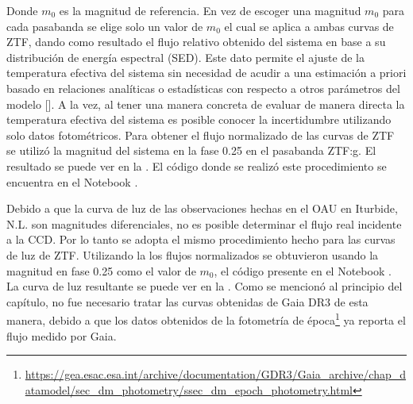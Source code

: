 Donde $m_0$ es la magnitud de referencia. En vez de escoger una magnitud $m_0$
para cada pasabanda se elige solo un valor de $m_0$ el cual se aplica a ambas
curvas de ZTF, dando como resultado el flujo relativo obtenido del sistema en
base a su distribución de energía espectral (SED). Este dato permite el ajuste
de la temperatura efectiva del sistema sin necesidad de acudir a una estimación
a priori basado en relaciones analíticas o estadísticas con respecto a otros
parámetros del modelo
[]. A la
vez, al tener una manera concreta de evaluar de manera directa la temperatura
efectiva del sistema es posible conocer la incertidumbre utilizando solo datos
fotométricos. Para obtener el flujo normalizado de las curvas de ZTF se utilizó
la magnitud del sistema en la fase 0.25 en el pasabanda ZTF:g. El resultado se
puede ver en la . El código donde se realizó
este procedimiento se encuentra en el Notebook
\href{https://github.com/KnightIV/UANL_MAPTA_Observaciones/blob/main/analisis/ztf/light-curve-processing.ipynb}{}.

Debido a que la curva de luz de las observaciones hechas en el OAU en Iturbide,
N.L. son magnitudes diferenciales, no es posible determinar el flujo real
incidente a la CCD. Por lo tanto se adopta el mismo procedimiento hecho para las
curvas de luz de ZTF. Utilizando la  los
flujos normalizados se obtuvieron usando la magnitud en fase 0.25 como el valor
de $m_0$, el código presente en el Notebook
\href{https://github.com/KnightIV/UANL_MAPTA_Observaciones/blob/main/analisis/period-analysis/periodogram.ipynb}{}.
La curva de luz resultante se puede ver en la
. Como se mencionó al principio del capítulo,
no fue necesario tratar las curvas obtenidas de Gaia DR3 de esta manera, debido
a que los datos obtenidos de la fotometría de
época\footnote{\url{https://gea.esac.esa.int/archive/documentation/GDR3/Gaia_archive/chap_datamodel/sec_dm_photometry/ssec_dm_epoch_photometry.html}}
ya reporta el flujo medido por Gaia. 

